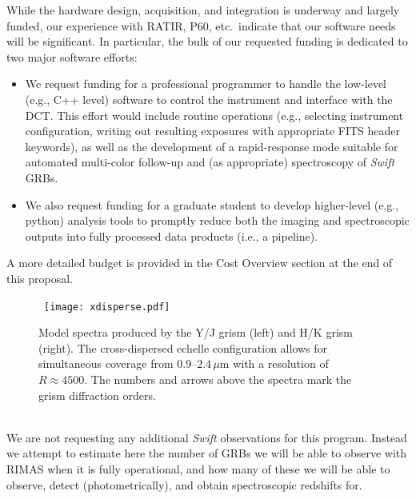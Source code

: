 \documentclass[letterpaper,11pt]{article}
\begin{document}
\smallskip

While the hardware design, acquisition, and integration is underway and largely 
funded, our experience with RATIR, P60, etc.~indicate that our software needs will
be significant.  In particular, the bulk of our requested funding is dedicated to 
two major software efforts:
\begin{itemize}
\item We request funding for a professional programmer to handle the low-level (e.g.,
C++ level) software to control the instrument and interface with the DCT.  This 
effort would include routine operations (e.g., selecting instrument configuration,
writing out resulting exposures with appropriate FITS header keywords), as well as 
the development of a rapid-response mode suitable for automated multi-color 
follow-up and (as appropriate) spectroscopy of \textit{Swift} GRBs.
\item We also request funding for a graduate student to develop higher-level (e.g.,
python) analysis tools to promptly reduce both the imaging and spectroscopic outputs
into fully processed data products (i.e., a pipeline).    
\end{itemize}
A more detailed budget is provided in the Cost Overview section at the end of 
this proposal.

\smallskip

\begin{figure}[tp!]
\begin{center}
\hbox{
\texttt{[image: xdisperse.pdf]}
}
\end{center}
\caption{\footnotesize
{Model spectra produced by the Y/J grism (left) and H/K grism (right).  The
cross-dispersed echelle configuration allows for simultaneous coverage from 
0.9--2.4\,$\mu$m with a resolution of $R \approx 4500$.  The numbers and 
arrows above the spectra mark the grism diffraction orders.}}
\label{fig3}
\end{figure}

\smallskip\\
We are not requesting any additional \textit{Swift} observations for this program.
Instead we attempt to estimate here the number of GRBs we will be able to observe
with RIMAS when it is fully operational, and how many of these we will be able to 
observe, detect (photometrically), and obtain spectroscopic redshifts for. 
\end{document}
